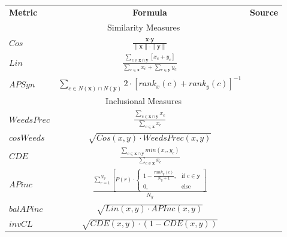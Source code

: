 \renewcommand{\arraystretch}{1.2} 
\begin{table}\centering
    \begin{tabular}{@{}lcl@{}} \toprule
    \textbf{Metric} & \textbf{Formula} & \textbf{Source} \\ 
    \cmidrule{1-3}
    \multicolumn{3}{c}{Similarity Measures} \\ \cmidrule{1-3}
    $Cos$   & 
    $\displaystyle\frac{\textbf{x} \cdot \textbf{y}}{\|\textbf{x}\| \cdot \|\textbf{y}\|}$ & \citep{salton1975vector} \\[2ex]
    $Lin$      &
    $\displaystyle\frac{\sum_{c \in \textbf{x} \cap \textbf{y} }\left[x_{c} + y_{c} \right]}{\sum_{c \in \textbf{x}}x_{c} + \sum_{c \in \textbf{y}}y_c}$ & 
    \citep{lin1998information} \\[2ex]
    $APSyn$               &
    $\displaystyle\sum_{c \in N\left(\textbf{x}\right) \cap N\left(\textbf{y}\right)}2 \cdot \left[rank_{x}\left(c\right) + rank_{y}\left(c\right)\right]^{-1}$ & 
    \citep{santus2016unsupervised} \\[2ex]
    \cmidrule{1-3}
    \multicolumn{3}{c}{Inclusional Measures} \\ \cmidrule{1-3}
    $WeedsPrec$     &
    $\displaystyle\frac{\sum_{c \in \textbf{x} \cap \textbf{y} }x_{c}}{\sum_{c \in \textbf{x}}x_{c}}$ & 
    \citep{weeds2003general} \\[2ex]
    $cosWeeds$            &
    $\displaystyle\sqrt{Cos(x,y) \cdot WeedsPrec(x,y)}$ & 
    \citep{lenci2012identifying} \\[2ex]
    $CDE$            &
    $\displaystyle\frac{\sum_{c \in \textbf{x} \cap \textbf{y} }min\left(x_c, y_c\right)}{\sum_{c \in \textbf{x}}x_c}$ & 
    \citep{clarke2009context} \\[2ex]
    $APinc$            &
    $\displaystyle\frac{\sum_{r=1}^{N_y}\left[P\left(r\right) \cdot 
    \begin{cases}
    1-\frac{rank_y\left(c\right)}{N_y + 1},& \text{if } c\in \textbf{y}\\
    0,              & \text{else}
    \end{cases}\right]}{N_y}$ & 
    \citep{kotlerman2010directional} \\[2ex]
    $balAPinc$            &
    $\displaystyle\sqrt{Lin(x,y) \cdot APInc(x,y)}$ & 
    \citep{kotlerman2010directional} \\[2ex]
    $invCL$               &
    $\displaystyle\sqrt{CDE(x,y) \cdot \left(1 - CDE(x,y)\right)}$& 

\end{tabular}
\end{table}
